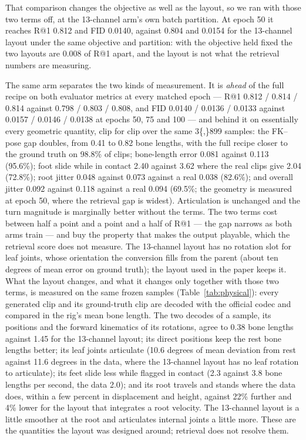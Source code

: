 That comparison changes the objective as well as the layout, so we ran \rep{} with those two terms off,
at the 13-channel arm's own batch partition. At epoch 50 it reaches R@1 \num{0.812} and FID
\num{0.0140}, against \num{0.804} and \num{0.0154} for the 13-channel layout under the same objective
and partition: with the objective held fixed the two layouts are \num{0.008} of R@1 apart, and the
layout is not what the retrieval numbers are measuring.

The same arm separates the two kinds of measurement. It is \emph{ahead} of the full recipe on both
evaluator metrics at every matched
epoch --- R@1 \num{0.812} / \num{0.814} / \num{0.814} against \num{0.798} / \num{0.803} / \num{0.808},
and FID \num{0.0140} / \num{0.0136} / \num{0.0133} against \num{0.0157} / \num{0.0146} / \num{0.0138}
at epochs 50, 75 and 100 --- and behind it on
essentially every geometric quantity, clip for clip over the same \num{3{,}899} samples: the FK--pose
gap doubles, from \num{0.41} to \num{0.82} bone lengths, with the full recipe closer to the ground
truth on \num{98.8}\% of clips; bone-length error \num{0.081} against \num{0.113} (\num{95.6}\%);
foot slide while in contact \num{2.40} against \num{3.62} where the real clips give \num{2.04}
(\num{72.8}\%); root jitter \num{0.048} against \num{0.073} against a real \num{0.038}
(\num{82.6}\%); and overall jitter \num{0.092} against \num{0.118} against a real \num{0.094}
(\num{69.5}\%; the geometry is measured at epoch 50, where the retrieval gap is widest). Articulation is
unchanged and the turn magnitude is marginally better without the terms. The two terms cost between half
a point and a point and a half of R@1 --- the gap narrows as both arms train --- and buy the property
that makes the output playable, which the retrieval score does not measure. The 13-channel layout has no rotation slot for leaf joints,
whose orientation the conversion fills from the parent (about ten degrees of mean error on ground
truth); the layout used in the paper keeps it.
What the layout changes, and what it changes only together with those two terms, is measured on the same
frozen samples (Table~\ref{tab:physical}): every
generated clip and its ground-truth clip are decoded with the official codec and compared in the rig's mean
bone length. The two decodes of a \rep{} sample, its positions and the forward kinematics of its rotations,
agree to \num{0.38} bone lengths against \num{1.45} for the 13-channel layout; its direct positions keep the
rest bone lengths better; its leaf joints articulate (\num{10.6} degrees of mean deviation from rest against
\num{11.6} degrees in the data, where the 13-channel layout has no leaf rotation to articulate); its feet
slide less while flagged in contact (\num{2.3} against \num{3.8} bone lengths per second, the data \num{2.0});
and its root travels and stands where the data does, within a few percent in displacement and height, against
\num{22}\% further and \num{4}\% lower for the layout that integrates a root velocity. The
13-channel layout is a little smoother at the root and articulates internal joints a little more. These are
the quantities the layout was designed around; retrieval does not resolve them.

